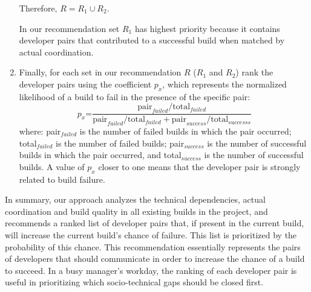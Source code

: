 \documentclass[conference]{IEEEtran}
\begin{document}
\begin{enumerate}
Therefore, $R = R_1 \cup R_2$.

In our recommendation set $R_1$ has highest priority because it contains developer pairs that contributed to a successful build when matched by actual coordination.  


\item Finally, for each set in our recommendation $R$ ($R_1$ and $R_2$) rank the developer pairs using the coefficient $p_x$, which represents the normalized likelihood of a build
to fail in the presence of the specific pair:
$$
p_x\text{=}\frac{ \text{pair}_{failed} / \text{total}_{failed} }
                     { \text{pair}_{failed} / \text{total}_{failed} + \text{pair}_{success} / \text{total}_{successs}}
$$
where: pair$_{failed}$ is the number of failed builds in which the pair occurred; total$_{failed}$ is the number of failed builds; pair$_{success}$ is the number of successful builds in which the pair occurred, and total$_{success}$ is the number of successful builds.
A value of $p_x$ closer to one means that the developer pair is strongly related to build
failure. 
\end{enumerate}

In summary, our approach analyzes the technical dependencies, actual coordination and build quality in all existing builds in the project, and recommends a ranked list of developer pairs that, if present in the current build, will increase the current build's chance of failure. This list is prioritized by the probability of this chance. This recommendation essentially represents the pairs of developers that should communicate in order to increase the chance of a build to succeed. In a busy manager's workday, the ranking of each developer pair is useful in prioritizing which socio-technical gaps should be closed first. 

\end{document}
